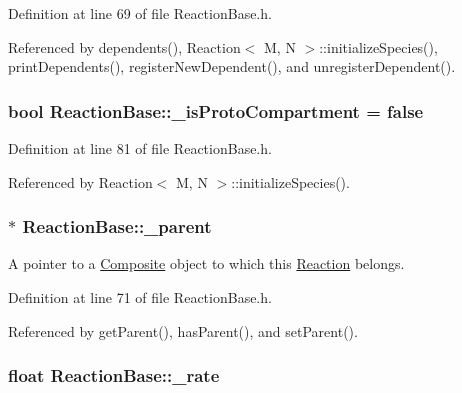 Definition at line 69 of file Reaction\+Base.\+h.



Referenced by dependents(), Reaction$<$ M, N $>$\+::initialize\+Species(), print\+Dependents(), register\+New\+Dependent(), and unregister\+Dependent().

\hypertarget{classReactionBase_adf06f0937df570e381fb8db4312d81c6}{
\subsubsection[{\+\_\+is\+Proto\+Compartment}]{\setlength{\rightskip}{0pt plus 5cm}bool Reaction\+Base\+::\+\_\+is\+Proto\+Compartment = false\hspace{0.3cm}{\ttfamily [protected]}}}\label{classReactionBase_adf06f0937df570e381fb8db4312d81c6}


Definition at line 81 of file Reaction\+Base.\+h.



Referenced by Reaction$<$ M, N $>$\+::initialize\+Species().

\hypertarget{classReactionBase_a7ad71ef8d77e5ad85be9126f4f4f4b70}{
\subsubsection[{\+\_\+parent}]{$\ast$ Reaction\+Base\+::\+\_\+parent\hspace{0.3cm}{\ttfamily [protected]}}}\label{classReactionBase_a7ad71ef8d77e5ad85be9126f4f4f4b70}


A pointer to a \hyperlink{classComposite}{Composite} object to which this \hyperlink{classReaction}{Reaction} belongs. 



Definition at line 71 of file Reaction\+Base.\+h.



Referenced by get\+Parent(), has\+Parent(), and set\+Parent().

\hypertarget{classReactionBase_a6eea78021fc01eecae6666edc0532e44}{
\subsubsection[{\+\_\+rate}]{\setlength{\rightskip}{0pt plus 5cm}float Reaction\+Base\+::\+\_\+rate\hspace{0.3cm}{\ttfamily [protected]}}}\label{classReactionBase_a6eea78021fc01eecae6666edc0532e44}


